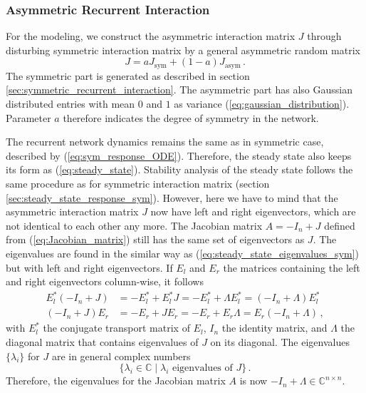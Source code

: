 \documentclass[11pt]{article}
\begin{document}
	 
	\subsubsection{Asymmetric Recurrent Interaction} \label{sec:asym_recurrent_network}
	For the modeling, we construct the asymmetric interaction matrix $J$ through disturbing symmetric interaction matrix by a general asymmetric random matrix
		\begin{equation} \label{eq:asym_interaction_matrix}
			J = a J_{\text{sym}} + (1-a) J_{\text{asym}} \, .
		\end{equation}
	The symmetric part is generated as described in section \ref{sec:symmetric_recurrent_interaction}. The asymmetric part has also Gaussian distributed entries with mean $0$ and $1$ as variance (\ref{eq:gaussian_distribution}). Parameter $a$ therefore indicates the degree of symmetry in the network. 
	
	The recurrent network dynamics remains the same as in symmetric case, described by (\ref{eq:sym_response_ODE}). Therefore, the steady state also keeps its form as (\ref{eq:steady_state}). Stability analysis of the steady state follows the same procedure as for symmetric interaction matrix (section \ref{sec:steady_state_response_sym}). However, here we have to mind that the asymmetric interaction matrix $J$ now have left and right eigenvectors, which are not identical to each other any more. The Jacobian matrix $A = -I_n + J$ defined from (\ref{eq:Jacobian_matrix}) still has the same set of eigenvectors as $J$. The eigenvalues are found in the similar way as (\ref{eq:steady_state_eigenvalues_sym}) but with left and right eigenvectors. If $E_l$ and $E_r$ the matrices containing the left and right eigenvectors column-wise, it follows
		\begin{equation}
			\begin{split}
				E_l^*(-I_n + J) &= - E_l^* + E_l^* J =  - E_l^* + \Lambda E_l^* = (-I_n + \Lambda) E_l^* \\
				(-I_n + J) E_r &= - E_r + J E_r = -E_r + E_r \Lambda = E_r (-I_n + \Lambda) \, , 
			\end{split}
		\end{equation}	
	with $E_l^*$ the conjugate transport matrix of $E_l$, $I_n$ the identity matrix, and $\Lambda$ the diagonal matrix that contains eigenvalues of $J$ on its diagonal. The eigenvalues $\{\lambda_i\}$ for $J$ are in general complex numbers
	\begin{equation}
		\{\lambda_i \in \mathbb{C} \mid \lambda_i \text{ eigenvalues of $J$}\} \, .
	\end{equation}
	Therefore, the eigenvalues for the Jacobian matrix $A$ is now $-I_n + \Lambda \in \mathbb{C}^{n \times n}$. 
	
\end{document}
